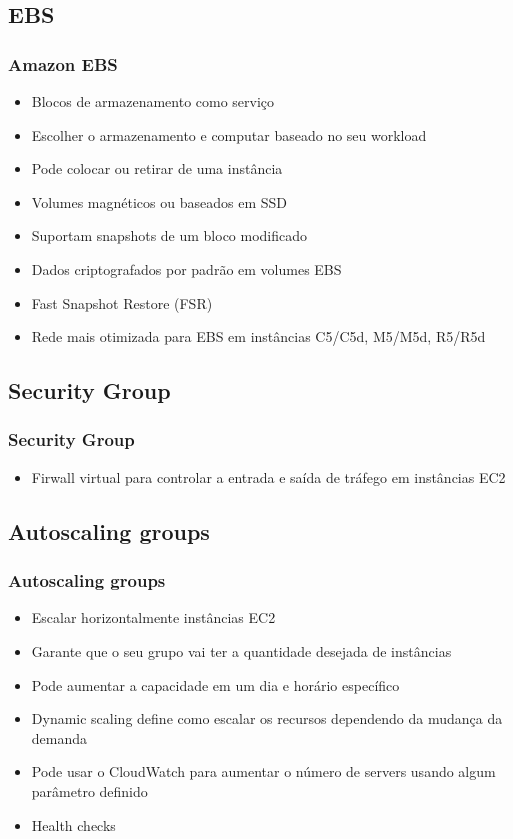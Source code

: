 \subsection{EBS}

\begin{frame}
	\frametitle{Amazon EBS}
	\begin{itemize}
		\item Blocos de armazenamento como serviço
		\item Escolher o armazenamento e computar baseado no seu workload
		\item Pode colocar ou retirar de uma instância
		\item Volumes magnéticos ou baseados em SSD
		\item Suportam snapshots de um bloco modificado
		\item Dados criptografados por padrão em volumes EBS
		\item Fast Snapshot Restore (FSR)
		\item Rede mais otimizada para EBS em instâncias C5/C5d, M5/M5d, R5/R5d
	\end{itemize}
\end{frame}

\subsection{Security Group}

\begin{frame}
	\frametitle{Security Group}
	\begin{itemize}
		\item Firwall virtual para controlar a entrada e saída de tráfego em instâncias EC2
	\end{itemize}
\end{frame}

\subsection{Autoscaling groups}

\begin{frame}
	\frametitle{Autoscaling groups}
	\begin{itemize}
		\item Escalar horizontalmente instâncias EC2
		\item Garante que o seu grupo vai ter a quantidade desejada de instâncias
		\item Pode aumentar a capacidade em um dia e horário específico
		\item Dynamic scaling define como escalar os recursos dependendo da mudança da demanda
		\item Pode usar o CloudWatch para aumentar o número de servers usando algum parâmetro definido
		\item Health checks
	\end{itemize}
\end{frame}

